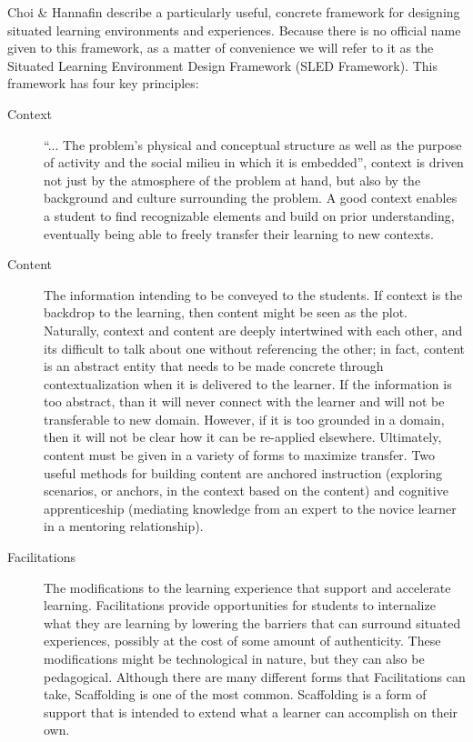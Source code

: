 Choi \& Hannafin \cite{situated-cognition} describe a particularly useful, concrete framework for designing situated learning environments and experiences. Because there is no official name given to this framework, as a matter of convenience we will refer to it as the Situated Learning Environment Design Framework (SLED Framework). This framework has four key principles:

\begin{description}
	\item[Context] ``... The problem's physical and conceptual structure as well as the purpose of activity and the social milieu in which it is embedded''\cite{rogoff1984everyday}, context is driven not just by the atmosphere of the problem at hand, but also by the background and culture surrounding the problem.
	A good context enables a student to find recognizable elements and build on prior understanding, eventually being able to freely transfer their learning to new contexts.
	\item[Content] The information intending to be conveyed to the students.
	If context is the backdrop to the learning, then content might be seen as the plot.
	Naturally, context and content are deeply intertwined with each other, and its difficult to talk about one without referencing the other; in fact, content is an abstract entity that needs to be made concrete through contextualization when it is delivered to the learner.
	If the information is too abstract, than it will never connect with the learner and will not be transferable to new domain.
	However, if it is too grounded in a domain, then it will not be clear how it can be re-applied elsewhere. 
	Ultimately, content must be given in a variety of forms to maximize transfer.
	Two useful methods for building content are anchored instruction (exploring scenarios, or anchors, in the context based on the content) and cognitive apprenticeship (mediating knowledge from an expert to the novice learner in a mentoring relationship).
	\item[Facilitations] The modifications to the learning experience that support and accelerate learning.
	Facilitations provide opportunities for students to internalize what they are learning by lowering the barriers that can surround situated experiences, possibly at the cost of some amount of authenticity. 
	These modifications might be technological in nature, but they can also be pedagogical.
	Although there are many different forms that Facilitations can take, Scaffolding is one of the most common.
	Scaffolding is a form of support that is intended to extend what a learner can accomplish on their own.

\end{description}
